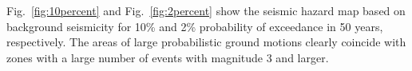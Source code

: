Fig.~\ref{fig:10percent} and Fig.~\ref{fig:2percent} show the seismic hazard map based on background seismicity for 10\% and 2\% probability of exceedance in 50 years, respectively. The areas of large probabilistic ground motions clearly coincide with zones with a large number of events with magnitude 3 and larger.



